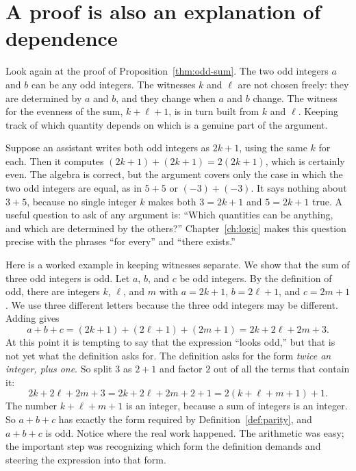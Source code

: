 \section{A proof is also an explanation of dependence}\label{ch01:sec:dependence}
Look again at the proof of Proposition~\ref{thm:odd-sum}. The two odd integers $a$ and $b$ can be any odd integers. The witnesses $k$ and $\ell$ are not chosen freely: they are determined by $a$ and $b$, and they change when $a$ and $b$ change. The witness for the evenness of the sum, $k+\ell+1$, is in turn built from $k$ and $\ell$. Keeping track of which quantity depends on which is a genuine part of the argument.

Suppose an assistant writes both odd integers as $2k+1$, using the same $k$ for each. Then it computes $(2k+1)+(2k+1)=2(2k+1)$, which is certainly even. The algebra is correct, but the argument covers only the case in which the two odd integers are equal, as in $5+5$ or $(-3)+(-3)$. It says nothing about $3+5$, because no single integer $k$ makes both $3=2k+1$ and $5=2k+1$ true. A useful question to ask of any argument is: ``Which quantities can be anything, and which are determined by the others?'' Chapter~\ref{ch:logic} makes this question precise with the phrases ``for every'' and ``there exists.''

Here is a worked example in keeping witnesses separate. We show that the sum of three odd integers is odd. Let $a$, $b$, and $c$ be odd integers. By the definition of odd, there are integers $k$, $\ell$, and $m$ with $a=2k+1$, $b=2\ell+1$, and $c=2m+1$. We use three different letters because the three odd integers may be different. Adding gives
\[
a+b+c=(2k+1)+(2\ell+1)+(2m+1)=2k+2\ell+2m+3.
\]
At this point it is tempting to say that the expression ``looks odd,'' but that is not yet what the definition asks for. The definition asks for the form \emph{twice an integer, plus one}. So split $3$ as $2+1$ and factor $2$ out of all the terms that contain it:
\[
2k+2\ell+2m+3=2k+2\ell+2m+2+1=2(k+\ell+m+1)+1.
\]
The number $k+\ell+m+1$ is an integer, because a sum of integers is an integer. So $a+b+c$ has exactly the form required by Definition~\ref{def:parity}, and $a+b+c$ is odd. Notice where the real work happened. The arithmetic was easy; the important step was recognizing which form the definition demands and steering the expression into that form.

